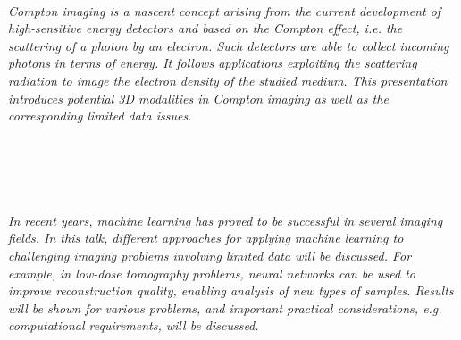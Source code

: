 \begin{multicols}{2}
\\ 
        \\
        \\\\
        \\
        \\\\
        \\
        \\\\
        \\
        \\\\
        \\
        \\\\
        \\
        \\\\
        \\
        \\\\
\\
      \textit{Compton imaging is a nascent concept arising from the current development of high-sensitive energy detectors and based on the Compton effect, i.e. the scattering of a photon by an electron.  Such detectors are able to collect incoming photons in terms of energy. It follows applications exploiting the scattering radiation to image the electron density of the studied medium.  This presentation introduces potential 3D modalities in Compton imaging as well as the corresponding limited data issues.}\\
\\ 
        \\
        \\\\
\\
      \textit{In recent years, machine learning has proved to be successful in several imaging fields. In this talk, different approaches for applying machine learning to challenging imaging problems involving limited data will be discussed. For example, in low-dose tomography problems, neural networks can be used to improve reconstruction quality, enabling analysis of new types of samples. Results will be shown for various problems, and important practical considerations, e.g. computational requirements, will be discussed.}\\

\end{multicols}
